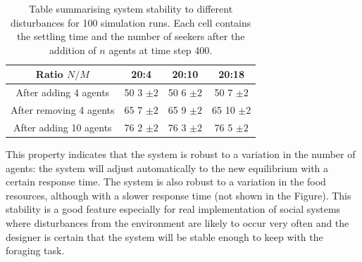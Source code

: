 \begin{table}
\renewcommand{\arraystretch}{1.3}
\caption[System stability for variation of agent population]{
Table summarising system stability to different disturbances
for 100 simulation runs.
Each cell contains the settling time and the number of seekers after
the addition of $n$ agents at time step 400.\label{tab:stability}}
\begin{center}
\begin{tabular}{@{}cccc@{}}
\hline
\hline
Ratio $N/M$ & 20:4 & 20:10 & 20:18\\
\hline
After adding 4 agents & 50 3 $\pm2$ & 50 6 $\pm2$& 50 7 $\pm2$\\
\hline
After removing 4 agents & 65 7 $\pm2$& 65 9 $\pm2$& 65 10 $\pm2$\\
After adding 10 agents & 76 2 $\pm2$& 76 3 $\pm2$& 76 5 $\pm2$\\
\end{tabular}
\end{center}
\end{table}

This property indicates that the system is robust to a variation in the number
of agents: the system will adjust automatically to the new equilibrium with a certain
response time.
The system is also robust to a variation in the food resources, although with 
a slower response time (not shown in the Figure).
This stability is a good feature especially for real implementation of 
social systems where disturbances from the environment are likely to occur
very often and the designer is certain that the system will be stable enough
to keep with the foraging task.


